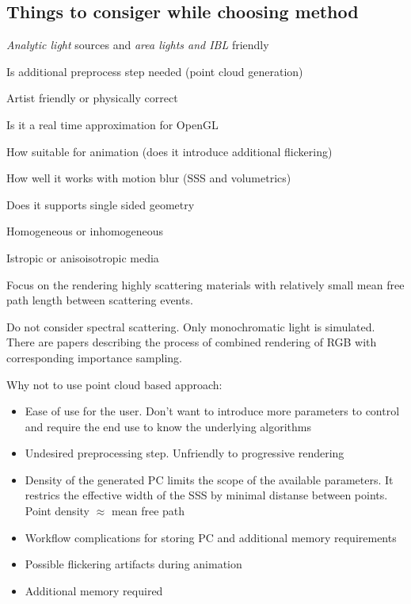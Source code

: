 \subsection{Things to consiger while choosing method}
\begin{description}
  \item [Lighting restrictions] \emph{Analytic light} sources and \emph{area lights and IBL} friendly
  \item [Multiple object friendly]
  \item [Preprocess] Is additional preprocess step needed (point cloud generation)
  \item [Parametrization] Artist friendly or physically correct
  \item [Performance] Is it a real time approximation for OpenGL
  \item [Flickering] How suitable for animation (does it introduce additional flickering)
  \item [Motion blur] How well it works with motion blur (SSS and volumetrics)
  \item [Closed objecs only] Does it supports single sided geometry
  \item Homogeneous or inhomogeneous
  \item Istropic or anisoisotropic media
\end{description}

Focus on the rendering highly scattering materials with relatively small mean
free path length between scattering events.

Do not consider spectral scattering. Only monochromatic light is simulated.
There are papers describing the process of combined rendering of RGB with
corresponding importance sampling.

Why not to use point cloud based approach:
\begin{itemize}
    \item{Ease of use for the user. Don't want to introduce more parameters to
    control and require the end use to know the underlying algorithms}
    \item{Undesired preprocessing step. Unfriendly to progressive rendering}
    \item{Density of the generated PC limits the scope of the available
    parameters. It restrics the effective width of the SSS by minimal distanse
    between points. Point density $\approx$ mean free path}
    \item{Workflow complications for storing PC and additional memory
    requirements}
    \item{Possible flickering artifacts during animation}
    \item{Additional memory required}
\end{itemize}


